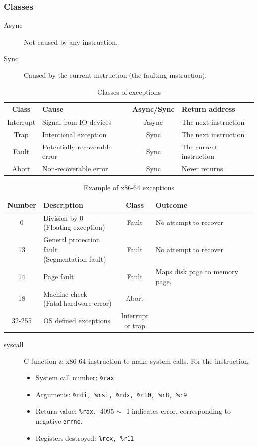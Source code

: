 \subsubsection{Classes}
\begin{description}
	\item[Async]Not caused by any instruction.
	\item[Sync]Caused by the current instruction (the faulting instruction). 
\end{description}
\begin{table}[h]
\centering
\caption{Classes of exceptions}
\begin{tabular}{clcl}\toprule
Class & Cause & Async/Sync & Return address\\\midrule
Interrupt & Signal from IO devices & Async & The next instruction \\
Trap & Intentional exception & Sync & The next instruction\\
Fault & Potentially recoverable error & Sync & The current instruction\\
Abort & Non-recoverable error & Sync & Never returns\\\bottomrule
\end{tabular}
\end{table}
\begin{table}[h]
\centering
\caption{Example of x86-64 exceptions}
\begin{tabular}{c|l|c|l}\toprule
Number & Description & Class & Outcome\\\midrule
0 & \parcell{Division by 0\\ (Floating exception)}& Fault & No attempt to recover\\\midrule
13 & \parcell{General protection fault\\ (Segmentation fault)} & Fault & No attempt to recover\\\midrule
14 & Page fault & Fault & Maps disk page to memory page. \\\midrule
18 & \parcell{Machine check\\ (Fatal hardware error)} & Abort & \\\midrule
32-255 & OS defined exceptions & \parcell{Interrupt\\or trap} & \\\bottomrule 
\end{tabular}
\end{table}
\begin{description}
	\item[syscall]C function \& x86-64 instruction to make system calls. For the instruction:
	\begin{itemize}
		\item System call number: \texttt{\%rax}
		\item Arguments: \texttt{\%rdi, \%rsi, \%rdx, \%r10, \%r8, \%r9}
		\item Return value: \texttt{\%rax}. -4095 $\sim$ -1 indicates error, corresponding to negative \texttt{errno}.
		\item Registers destroyed: \texttt{\%rcx, \%r11}
	\end{itemize} 
\end{description}
